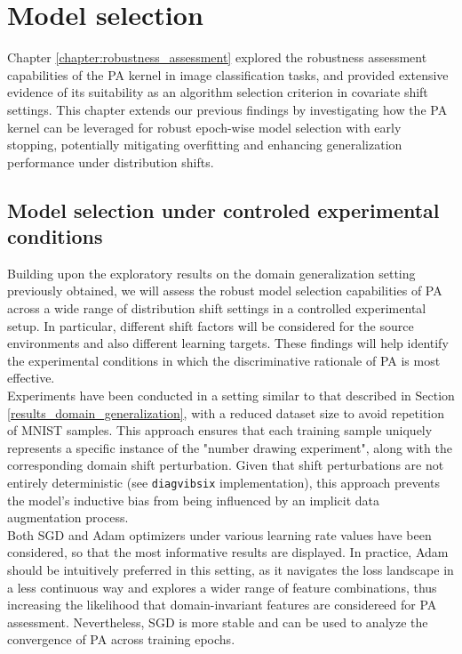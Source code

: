 \chapter{Model selection}\label{chapter:model_selection}

Chapter \ref{chapter:robustness_assessment} explored the robustness assessment
capabilities of the PA kernel in image classification tasks, and provided extensive 
evidence of its suitability as an algorithm selection criterion in covariate shift settings. 
This chapter extends our previous findings by investigating 
how the PA kernel can be leveraged for robust epoch-wise model selection
with early stopping, potentially mitigating overfitting and enhancing
generalization performance under distribution shifts.

\section{Model selection under controled experimental conditions}\label{chapter:msel_controlled}

Building upon the exploratory results on the domain generalization setting previously obtained, 
we will assess the robust model selection capabilities of PA across a
wide range of distribution shift settings in a controlled experimental setup. In particular,
different shift factors will be considered for the source environments and also different learning
targets. These findings will help identify the experimental conditions in which the 
discriminative rationale of PA is most effective. \\

Experiments have been conducted in a setting similar to that described in Section 
\ref{results_domain_generalization}, with a reduced dataset size to avoid repetition of MNIST 
samples. This approach ensures that each training sample uniquely represents a specific instance 
of the "number drawing experiment", along with the corresponding domain 
shift perturbation. Given that shift perturbations are not entirely deterministic 
(see \texttt{diagvibsix} implementation), this approach prevents the model's inductive bias 
from being influenced by an implicit data augmentation process. \\

Both SGD and Adam optimizers under various learning rate values have been considered, 
so that the most informative results are displayed. In practice, Adam should be intuitively preferred
in this setting, as it navigates the loss landscape in a less continuous way and
explores a wider range of feature combinations, thus increasing the likelihood that domain-invariant
features are considereed for PA assessment. Nevertheless, SGD is more stable and can be used to
analyze the convergence of PA across training epochs. \\


